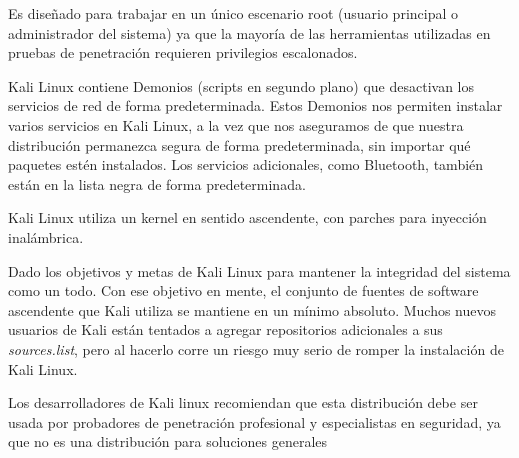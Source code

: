 \begin{multicols}{2}


Es diseñado para trabajar en un único escenario root (usuario principal o administrador del sistema) ya que la mayoría de las herramientas utilizadas en pruebas de penetración requieren privilegios escalonados.\\


Kali Linux contiene Demonios (scripts en segundo plano) que desactivan los servicios de red de forma predeterminada. Estos Demonios nos permiten instalar varios servicios en Kali Linux, a la vez que nos aseguramos de que nuestra distribución permanezca segura de forma predeterminada, sin importar qué paquetes estén instalados. Los servicios adicionales, como Bluetooth, también están en la lista negra de forma predeterminada.\\


Kali Linux utiliza un kernel en sentido ascendente, con parches para inyección inalámbrica.\\


Dado los objetivos y metas de Kali Linux para mantener la integridad del sistema como un todo. Con ese objetivo en mente, el conjunto de fuentes de software ascendente que Kali utiliza se mantiene en un mínimo absoluto. Muchos nuevos usuarios de Kali están tentados a agregar repositorios adicionales a sus \textit{sources.list}, pero al hacerlo corre un riesgo muy serio de romper la instalación de Kali Linux.\\


Los desarrolladores de Kali linux recomiendan que esta distribución debe ser usada por probadores de penetración profesional y especialistas en seguridad, ya que no es una distribución para soluciones generales



\end{multicols}
